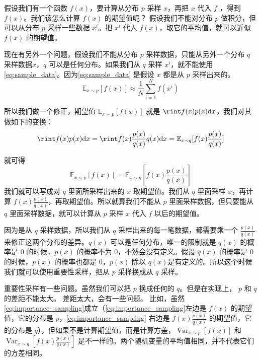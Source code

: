 假设我们有一个函数 $f(x)$，要计算从分布 $p$ 采样 $x$，再把 $x$ 代入 $f$ ，得到 $f(x)$。我们该怎么计算 $f(x)$ 的期望值呢？
假设我们不能对分布 $p$ 做积分，但可以从分布 $p$ 采样一些数据 $x^i$。把 $x^i$ 代入 $f(x)$，取它的平均值，就可以近似 $f(x)$ 的期望值。

现在有另外一个问题，假设我们不能从分布 $p$ 采样数据，只能从另外一个分布 $q$ 采样数据$x$，$q$ 可以是任何分布。如果我们从 $q$ 采样 $x^i$，就不能使用\eqref{eq:sample_data}。因为\eqref{eq:sample_data} 是假设 $x$ 都是从 $p$ 采样出来的。
\begin{equation}
    \mathbb{E}_{x \sim p}[f(x)] \approx \frac{1}{N} \sum_{i=1}^N f(x^i)
    \label{eq:sample_data}
\end{equation}

所以我们做一个修正，期望值 $\mathbb{E}_{x \sim p}[f(x)]$ 就是 $\rint f(x) p(x) \mathrm{d}x$，我们对其做如下的变换：
\begin{equation}
    \label{eq:}
    \rint f(x) p(x) \mathrm{d}x=\rint f(x) \frac{p(x)}{q(x)} q(x) \mathrm{d}x=\mathbb{E}_{x \sim q}[f(x){\frac{p(x)}{q(x)}}]
\end{equation}

就可得
\begin{equation}
    \label{eq:importance_sampling}
    \mathbb{E}_{x \sim p}[f(x)]=\mathbb{E}_{x \sim q}\left[f(x) \frac{p(x)}{q(x)}\right]
\end{equation}
我们就可以写成对 $q$ 里面所采样出来的 $x$ 取期望值。我们从 $q$ 里面采样 $x$，再计算 $f(x) \frac{p(x)}{q(x)}$，再取期望值。所以就算我们不能从 $p$ 里面采样数据，但只要能从 $q$ 里面采样数据，就可以计算从 $p$ 采样 $x$ 代入 $f$ 以后的期望值。

因为是从 $q$ 采样数据，所以我们从 $q$ 采样出来的每一笔数据，都需要乘一个 $\frac{p(x)}{q(x)}$ 来修正这两个分布的差异。$q(x)$ 可以是任何分布，唯一的限制就是 $q(x)$ 的概率是 0 的时候，$p(x)$ 的概率不为 0，不然会没有定义。假设  $q(x)$ 的概率是 0 的时候，$p(x)$ 的概率也都是 0，$p(x)$ 除以 $q(x)$是有定义的。所以这个时候我们就可以使用重要性采样，把从 $p$ 采样换成从 $q$ 采样。

重要性采样有一些问题。虽然我们可以把 $p$ 换成任何的 $q$。但是在实现上， $p$ 和 $q$ 的差距不能太大。
差距太大，会有一些问题。
比如，虽然\eqref{eq:importance_sampling}成立（\eqref{eq:importance_sampling}左边是 $f(x)$ 的期望值，它的分布是 $p$，\eqref{eq:importance_sampling} 右边是 $f(x) \frac{p(x)}{q(x)}$ 的期望值，它的分布是 $q$），但如果不是计算期望值，而是计算方差，$\operatorname{Var}_{x \sim p}[f(x)]$ 和 $\operatorname{Var}_{x \sim q}\left[f(x) \frac{p(x)}{q(x)}\right]$ 是不一样的。两个随机变量的平均值相同，并不代表它们的方差相同。

